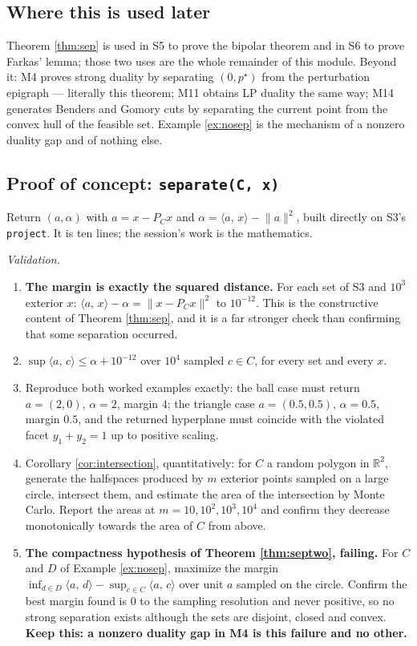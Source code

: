 \documentclass[11pt,a4paper]{article}
\theoremstyle{definition}
\theoremstyle{plain}
\theoremstyle{remark}
\newcommand{\R}{\mathbb{R}}
\newcommand{\ip}[2]{\langle #1,\, #2\rangle}
\newcommand{\norm}[1]{\lVert #1\rVert}
\newcommand{\proj}{P}
\begin{document}
\subsection*{Where this is used later}

Theorem \ref{thm:sep} is used in S5 to prove the bipolar theorem and in S6 to prove Farkas'
lemma; those two uses are the whole remainder of this module. Beyond it: M4 proves strong
duality by separating $(0,p^\star)$ from the perturbation epigraph --- literally this theorem;
M11 obtains LP duality the same way; M14 generates Benders and Gomory cuts by separating the
current point from the convex hull of the feasible set. Example \ref{ex:nosep} is the mechanism
of a nonzero duality gap and of nothing else.

\subsection*{Proof of concept: \texttt{separate(C, x)}}

Return $(a,\alpha)$ with $a=x-\proj_Cx$ and $\alpha=\ip{a}{x}-\norm a^2$, built directly on S3's
\texttt{project}. It is ten lines; the session's work is the mathematics.

\emph{Validation.}
\begin{enumerate}
\item \textbf{The margin is exactly the squared distance.} For each set of S3 and $10^3$
exterior $x$: $\ip{a}{x}-\alpha=\norm{x-\proj_Cx}^2$ to $10^{-12}$. This is the constructive
content of Theorem \ref{thm:sep}, and it is a far stronger check than confirming that some
separation occurred.
\item $\sup\ip{a}{c}\le\alpha+10^{-12}$ over $10^4$ sampled $c\in C$, for every set and every
$x$.
\item Reproduce both worked examples exactly: the ball case must return $a=(2,0)$, $\alpha=2$,
margin $4$; the triangle case $a=(0.5,0.5)$, $\alpha=0.5$, margin $0.5$, and the returned
hyperplane must coincide with the violated facet $y_1+y_2=1$ up to positive scaling.
\item Corollary \ref{cor:intersection}, quantitatively: for $C$ a random polygon in $\R^2$,
generate the halfspaces produced by $m$ exterior points sampled on a large circle, intersect
them, and estimate the area of the intersection by Monte Carlo. Report the areas at
$m=10,10^2,10^3,10^4$ and confirm they decrease monotonically towards the area of $C$ from
above.
\item \textbf{The compactness hypothesis of Theorem \ref{thm:septwo}, failing.} For $C$ and $D$
of Example \ref{ex:nosep}, maximize the margin
$\inf_{d\in D}\ip{a}{d}-\sup_{c\in C}\ip{a}{c}$ over unit $a$ sampled on the circle. Confirm the
best margin found is $0$ to the sampling resolution and never positive, so no strong separation
exists although the sets are disjoint, closed and convex. \textbf{Keep this: a nonzero duality
gap in M4 is this failure and no other.}
\end{enumerate}
\end{document}
